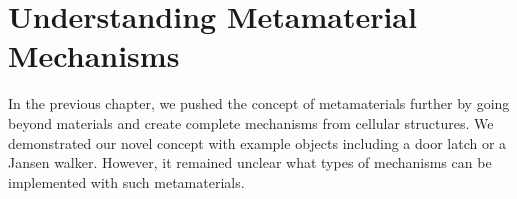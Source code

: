 \chapter{Understanding Metamaterial Mechanisms}
\label{chapter:Understanding-metamaterial-mechanisms}





In the previous chapter, we pushed the concept of metamaterials further by going beyond materials and create complete mechanisms from cellular structures. 
We demonstrated our novel concept with example objects including a door latch or a Jansen walker. However, it remained unclear what types of mechanisms can be implemented with such metamaterials.

